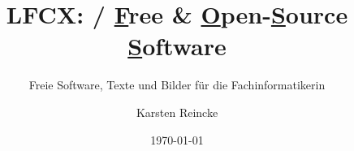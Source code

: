 \documentclass[]{beamer}
\title{LFCX: / 
  \underline{\textbf{F}}ree \& 
  \underline{\textbf{O}}pen-\underline{\textbf{S}}ource \underline{\textbf{S}}oftware}
\subtitle{Freie Software, Texte und Bilder für die Fachinformatikerin}
\institute[GS-LDK]{Gewerbliche Schulen Dillenburg}
\author{Karsten Reincke}
\date{\today}
\def\cfgGl{../../../cfg.gl/}
\begin{document}

\begin{frame}
  \titlepage

  

\end{frame}

%









\logo{}
\newpage



%
\end{document}
